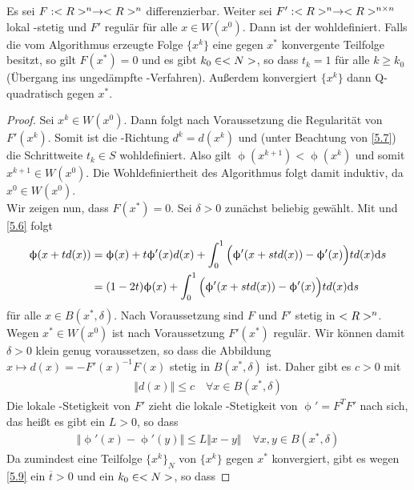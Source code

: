 \begin{proposition}
	Es sei $F:<R>^n\to<R>^n$ differenzierbar. Weiter sei $F':<R>^n\to<R>^{n\times n}$ lokal -stetig und $F'$ regulär für alle $x\in W(x^0)$. Dann ist der  wohldefiniert. Falls die vom Algorithmus erzeugte Folge $\{x^k\}$ eine gegen $x^\ast$ konvergente Teilfolge besitzt, so gilt $F(x^\ast)=0$ und es gibt $k_0\in<N>$, so dass $t_k=1$ für alle $k\ge k_0$ (Übergang ins ungedämpfte -Verfahren). Außerdem konvergiert $\{x^k\}$ dann Q-quadratisch gegen $x^\ast$.
\end{proposition}
\begin{proof}
	Sei $x^k\in W(x^0)$. Dann folgt nach Voraussetzung die Regularität von $F'(x^k)$. Somit ist die -Richtung $d^k=d(x^k)$ und (unter Beachtung von \cref{5.7}) die Schrittweite $t_k\in S$ wohldefiniert. Also gilt $\upphi(x^{k+1})<\upphi(x^k)$ und somit $x^{k+1}\in W(x^0)$. Die Wohldefiniertheit des Algorithmus folgt damit induktiv, da $x^0\in W(x^0)$. \\
	Wir zeigen nun, dass $F(x^\ast)=0$. Sei $\delta>0$ zunächst beliebig gewählt. Mit  und \cref{5.6} folgt
	\begin{align}
		\label{5.8}
		\begin{split}
			\upphi(x+td(x)) &= \upphi(x) + t\upphi'(x)d(x) + \int_0^1 \Big(\upphi'(x+std(x)) - \upphi'(x)\Big)td(x)\mathrm{d} s \\
			&= (1-2t)\upphi(x) + \int_0^1 \Big(\upphi'(x+std(x)) - \upphi'(x)\Big)td(x)\mathrm{d} s
		\end{split}
	\end{align}
	für alle $x\in B(x^\ast,\delta)$. Nach Voraussetzung sind $F$ und $F'$ stetig in $<R>^n$. Wegen $x^\ast\in W(x^0)$ ist nach Voraussetzung $F'(x^\ast)$ regulär. Wir können damit $\delta>0$ klein genug voraussetzen, so dass die Abbildung $x\mapsto d(x)=-F'(x)^{-1}F(x)$ stetig in $B(x^\ast,\delta)$ ist. Daher gibt es $c>0$ mit 
	\begin{align}
		\label{5.9}
		\Vert d(x)\Vert \le c\quad\forall x\in B(x^\ast,\delta)
	\end{align}
	Die lokale -Stetigkeit von $F'$ zieht die lokale -Stetigkeit von $\upphi'=F^TF'$ nach sich, das heißt es gibt ein $L>0$, so dass
	\begin{align}
		\label{5.10}
		\Vert \upphi'(x) - \upphi'(y)\Vert \le L\Vert x-y\Vert\quad\forall x,y\in B(x^\ast,\delta)
	\end{align}
	Da zumindest eine Teilfolge $\{x^k\}_N$ von $\{x^k\}$ gegen $x^\ast$ konvergiert, gibt es wegen \cref{5.9} ein $\overline{t}>0$ und ein $k_0\in<N>$, so dass

\end{proof}
